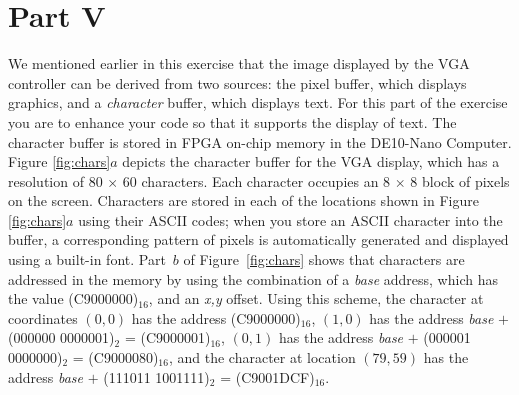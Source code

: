 \documentclass[epsfig,10pt,fullpage]{article}
\begin{document}
\section*{Part V}

\noindent
We mentioned earlier in this exercise that the image displayed by the VGA
controller can be derived from two sources: the pixel buffer, which displays graphics, 
and a {\it character} buffer, which displays text. For this part of the exercise you 
are to enhance your code so that it supports the display of text. The character buffer 
is stored in FPGA on-chip memory in the DE10-Nano Computer. Figure \ref{fig:chars}$a$ 
depicts the character buffer for the VGA
display, which has a resolution of 80 $\times$ 60 characters. Each character occupies an
8 $\times$ 8 block of pixels on the screen. Characters are stored in each of the locations
shown in Figure \ref{fig:chars}$a$ using their ASCII codes; when you store an ASCII character into
the buffer, a corresponding pattern of pixels is automatically generated and displayed using 
a built-in font. Part~$b$ of Figure~\ref{fig:chars} shows
that characters are addressed in the memory by using the combination of a {\it base} address,
which has the value (C9000000)$_{16}$, and an {\it x,y} offset. Using this scheme, the
character at coordinates $(0,0)$ has the address (C9000000)$_{16}$, 
$(1,0)$ has the address {\it base} $+$ (000000 0000001)$_2$ = (C9000001)$_{16}$, 
$(0,1)$ has the address {\it base} $+$ (000001 0000000)$_2$ = (C9000080)$_{16}$, and 
the character at location $(79,59)$ has the address {\it base} $+$ (111011 1001111)$_2$ = 
(C9001DCF)$_{16}$. 
\end{document}
